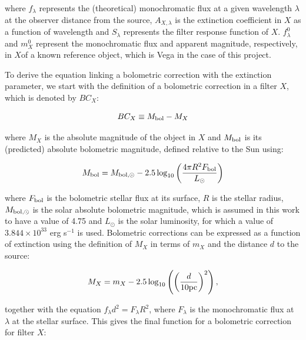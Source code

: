 \documentclass[12pt, a4paper]{report}
\begin{document}
where $f_{\lambda}$ represents the (theoretical) monochromatic flux at a given wavelength $\lambda$ at the observer distance from the source, $A_{X,\lambda}$ is the extinction coefficient in $X$ as a function of wavelength and $S_{\lambda}$ represents the filter response function of $X$. $f_{\lambda}^{0}$ and $m_{X}^{0}$ represent the monochromatic flux and apparent magnitude, respectively, in $X$of a known reference object, which is Vega in the case of this project.


To derive the equation linking a bolometric correction with the extinction parameter, we start with the definition of a bolometric correction in a filter $X$, which is denoted by $BC_{X}$:

\begin{equation}
BC_{X} \equiv M_{\textnormal{bol}} - M_{X}
\label{BC_def}
\end{equation}

where $M_{X}$ is the absolute magnitude of the object in $X$ and $M_{\textnormal{bol}}$ is its (predicted) absolute bolometric magnitude, defined relative to the Sun using:

\begin{equation}
M_{\textnormal{bol}} = M_{\textnormal{bol},\odot} - 2.5 \log_{10} \left( \frac{4\pi R^{2}F_{\textnormal{bol}}}{L_{\odot}} \right)
\label{mbol_sun}
\end{equation}

where  $F_{\textnormal{bol}}$ is the bolometric stellar flux at its surface, $R$ is the stellar radius, $M_{\textnormal{bol},\odot}$ is the solar absolute bolometric magnitude, which is assumed in this work to have a value of 4.75 and $L_{\odot}$ is the solar luminosity, for which a value of $3.844 \times 10^{33}$ erg s$^{-1}$ is used. Bolometric corrections can be expressed as a function of extinction using the definition of $M_{X}$ in terms of $m_{X}$ and the distance $d$ to the source:

\begin{equation}
M_{X} = m_{X} - 2.5 \log_{10}\left( \left( \frac{d}{10 \textnormal{pc}} \right)^{2} \right),
\label{abs_mag_def}
\end{equation}

together with the equation $f_{\lambda}d^{2}=F_{\lambda}R^{2}$, where $F_{\lambda}$ is the monochromatic flux at $\lambda$ at the stellar surface. This gives the final function for a bolometric correction for filter $X$:
\end{document}
